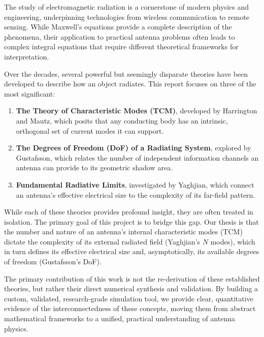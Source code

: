 \documentclass[11pt, a4paper]{report}
\begin{document}
The study of electromagnetic radiation is a cornerstone of modern physics and engineering, underpinning technologies from wireless communication to remote sensing. While Maxwell's equations provide a complete description of the phenomena, their application to practical antenna problems often leads to complex integral equations that require different theoretical frameworks for interpretation.

Over the decades, several powerful but seemingly disparate theories have been developed to describe how an object radiates. This report focuses on three of the most significant:
\begin{enumerate}
    \item \textbf{The Theory of Characteristic Modes (TCM)}, developed by Harrington and Mautz, which posits that any conducting body has an intrinsic, orthogonal set of current modes it can support.
    \item \textbf{The Degrees of Freedom (DoF) of a Radiating System}, explored by Gustafsson, which relates the number of independent information channels an antenna can provide to its geometric shadow area.
    \item \textbf{Fundamental Radiative Limits}, investigated by Yaghjian, which connect an antenna's effective electrical size to the complexity of its far-field pattern.
\end{enumerate}

While each of these theories provides profound insight, they are often treated in isolation. The primary goal of this project is to bridge this gap. Our thesis is that the number and nature of an antenna's internal characteristic modes (TCM) dictate the complexity of its external radiated field (Yaghjian's $N$ modes), which in turn defines its effective electrical size and, asymptotically, its available degrees of freedom (Gustafsson's DoF).

The primary contribution of this work is not the re-derivation of these established theories, but rather their direct numerical synthesis and validation. By building a custom, validated, research-grade simulation tool, we provide clear, quantitative evidence of the interconnectedness of these concepts, moving them from abstract mathematical frameworks to a unified, practical understanding of antenna physics.
\end{document}
